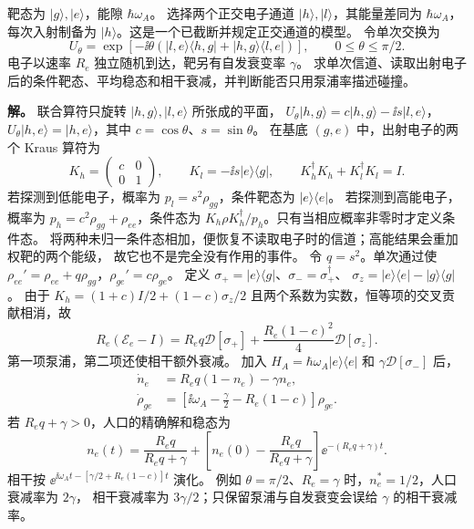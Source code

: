 \begin{exbox}
靶态为 $|g\rangle,|e\rangle$，能隙 $\hbar\omega_A$。
选择两个正交电子通道 $|h\rangle,|l\rangle$，其能量差同为 $\hbar\omega_A$，
每次入射制备为 $|h\rangle$。这是一个已截断并规定正交通道的模型。
令单次交换为
\[
U_\theta=\exp[-\ii\theta(|l,e\rangle\langle h,g|+|h,g\rangle\langle l,e|)],
\qquad 0\le\theta\le\pi/2.
\]
电子以速率 $R_e$ 独立随机到达，靶另有自发衰变率 $\gamma$。
求单次信道、读取出射电子后的条件靶态、平均稳态和相干衰减，并判断能否只用泵浦率描述碰撞。

\textbf{解。} 联合算符只旋转 $|h,g\rangle,|l,e\rangle$ 所张成的平面，
$U_\theta|h,g\rangle=c|h,g\rangle-\ii s|l,e\rangle$，
$U_\theta|h,e\rangle=|h,e\rangle$，其中 $c=\cos\theta$、$s=\sin\theta$。
在基底 $(g,e)$ 中，出射电子的两个 Kraus 算符为
\[
K_h=\begin{pmatrix}c&0\\0&1\end{pmatrix},\qquad
K_l=-\ii s|e\rangle\langle g|,\qquad K_h^\dagger K_h+K_l^\dagger K_l=I.
\]
若探测到低能电子，概率为 $p_l=s^2\rho_{gg}$，条件靶态为 $|e\rangle\langle e|$。
若探测到高能电子，概率为 $p_h=c^2\rho_{gg}+\rho_{ee}$，条件态为
$K_h\rho K_h^\dagger/p_h$。只有当相应概率非零时才定义条件态。
将两种未归一条件态相加，便恢复不读取电子时的信道；高能结果会重加权靶的两个能级，
故它也不是完全没有作用的事件。
令 $q=s^2$。单次通过使
$\rho_{ee}'=\rho_{ee}+q\rho_{gg}$，$\rho_{ge}'=c\rho_{ge}$。
定义 $\sigma_+=|e\rangle\langle g|$、$\sigma_-=\sigma_+^\dagger$、
$\sigma_z=|e\rangle\langle e|-|g\rangle\langle g|$。
由于 $K_h=(1+c)I/2+(1-c)\sigma_z/2$ 且两个系数为实数，恒等项的交叉贡献相消，故
\[
R_e(\mathscr E_e-I)
=R_eq\mathcal D[\sigma_+]+\frac{R_e(1-c)^2}{4}\mathcal D[\sigma_z].
\]
第一项泵浦，第二项还使相干额外衰减。
加入 $H_A=\hbar\omega_A|e\rangle\langle e|$ 和 $\gamma\mathcal D[\sigma_-]$ 后，
\begin{align*}
\dot n_e&=R_eq(1-n_e)-\gamma n_e,\\
\dot\rho_{ge}&=\left[\ii\omega_A-\frac\gamma2-R_e(1-c)\right]\rho_{ge}.
\end{align*}
若 $R_eq+\gamma>0$，人口的精确解和稳态为
\[
n_e(t)=\frac{R_eq}{R_eq+\gamma}
+\left[n_e(0)-\frac{R_eq}{R_eq+\gamma}\right]\ee^{-(R_eq+\gamma)t}.
\]
相干按 $\ee^{\ii\omega_At-[\gamma/2+R_e(1-c)]t}$ 演化。
例如 $\theta=\pi/2$、$R_e=\gamma$ 时，$n_e^*=1/2$，人口衰减率为 $2\gamma$，
相干衰减率为 $3\gamma/2$；只保留泵浦与自发衰变会误给 $\gamma$ 的相干衰减率。


\end{exbox}
